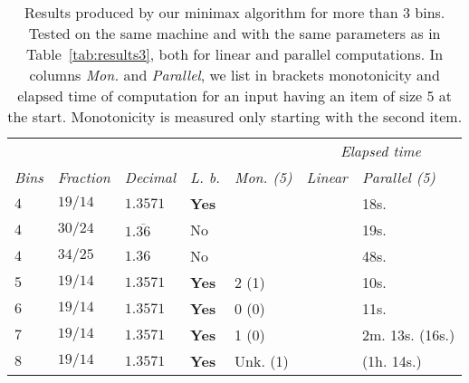 \begin{table}[H]
\begin{center}
\begin{tabular}{lllllll}
& & & & & \multicolumn{2}{c}{\textit{Elapsed time}}  \\
\textit{Bins} & \textit{Fraction} & \textit{Decimal} & \textit{L. b.} & \textit{Mon. (5)} & \textit{Linear} & \textit{Parallel (5)}\\
\hline
$4$  & $19/14$ &  $1.3571$ & \textbf{Yes} & & & 18s.  \\
$4$  & $30/24$ & $1.\overline{36}$ & No   & & & 19s. \\
$4$  & $34/25$ &  $1.36$   & No           & & & 48s.  \\ 
$5$  & $19/14$ &  $1.3571$ & \textbf{Yes} & 2 (1) & & 10s. \\
$6$  & $19/14$ &  $1.3571$ & \textbf{Yes} & 0 (0) & & 11s. \\
$7$  & $19/14$ &  $1.3571$ & \textbf{Yes} & 1 (0) & & 2m. 13s. (16s.) \\
$8$  & $19/14$ &  $1.3571$ & \textbf{Yes} & Unk. (1) & & (1h. 14s.)  \\
\end{tabular}
\end{center}
\caption{Results produced by our minimax algorithm for more than $3$ bins.
Tested on the same machine and with the same parameters
as in Table~\ref{tab:results3}, both for linear and parallel
computations. In columns \textit{Mon.} and \textit{Parallel}, we list
in brackets monotonicity and elapsed time of computation for an input
having an item of size 5 at the start. Monotonicity is measured only
starting with the second item.}
\label{tab:resultsmulti}
\end{table}


